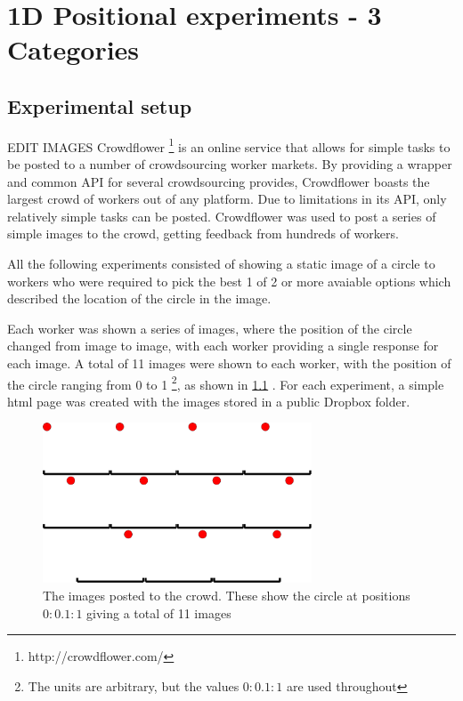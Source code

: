 \chapter{1D Positional experiments - 3 Categories} \label{Chapter: 1DPosition}

\newlength\figureheight
\newlength\figurewidth


\section{Experimental setup}
EDIT IMAGES
Crowdflower \footnote{ http://crowdflower.com/} is an online service that allows for simple tasks to be posted to a number of crowdsourcing worker markets. By providing a wrapper and common API for several crowdsourcing provides, Crowdflower boasts the largest crowd of workers out of any platform. Due to limitations in its API, only relatively simple tasks can be posted. Crowdflower was used to post a series of simple images to the crowd, getting feedback from hundreds of workers.

All the following experiments consisted of showing a static image of a circle to workers who were required to pick the best 1 of 2 or more avaiable options which described the location of the circle in the image. 

Each worker was shown a series of images, where the position of the circle changed from image to image, with each worker providing a single response for each image. A total of 11 images were shown to each worker, with the position of the circle ranging from 0 to 1 \footnote{The units are arbitrary, but the values $0:0.1:1$ are used throughout}, as shown in \ref{Figure:1d_position_images} . For each experiment, a simple html page was created with the images stored in a public Dropbox folder. 


\begin{figure}
  \centering
  \includegraphics[width=8cm]{combined_1d_images.png}
  \caption{The images posted to the crowd. These show the circle at positions $0:0.1:1$ giving a total of 11 images }
  \label{Figure:1d_position_images}
\end{figure}

